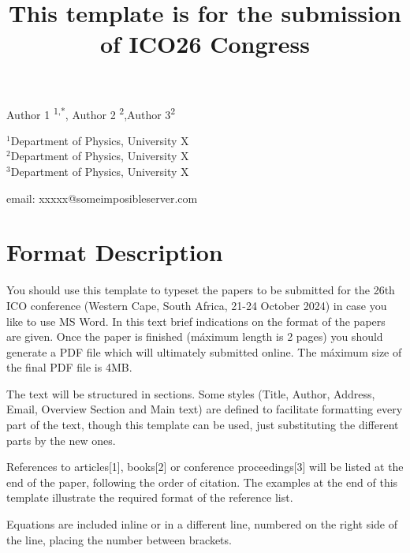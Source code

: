 \documentclass[letterpaper,10pt]{article}
\newcommand\authormark[1]{\textsuperscript{#1}}
\renewcommand{\headrulewidth}{0pt}%
\begin{document}
\date{}
\title{This template is for the submission of ICO26 Congress}
\maketitle
\vspace{-1.5cm}
\begin{center}
    Author 1 \authormark{1,*}, Author 2 \authormark{2},Author 3\authormark{2}
\end{center}

\begin{center}
$^{1}${Department of Physics, University X}\\
$^{2}${Department of Physics, University X}\\
$^{3}${Department of Physics, University X}
\end{center}


\begin{center}
    email: xxxxx@someimposibleserver.com
\end{center}
\pagestyle{empty}
\renewcommand\headrulewidth{0pt}
\vspace{0.5cm}
\section{Format Description}
You should use this template to typeset the papers to be submitted for the 26th ICO conference (Western Cape, South Africa, 21-24 October 2024) in case you like to use MS Word. In this text brief indications on the format of the papers are given. Once the paper is finished (máximum length is 2 pages) you should generate a PDF file which will ultimately submitted online. The máximum size of the final PDF file is 4MB. 

The text will be structured in sections. Some styles (Title, Author, Address, Email, Overview Section and Main text) are defined to facilitate formatting every part of the text, though this template can be used, just substituting the different parts by the new ones. 

References to articles[1], books[2] or conference proceedings[3] will be listed at the end of the paper, following the order of citation. The examples at the end of this template illustrate the required format of the reference list.



Equations are included inline or in a different line, numbered on the right side of the line, placing the number between brackets.
\end{document}
